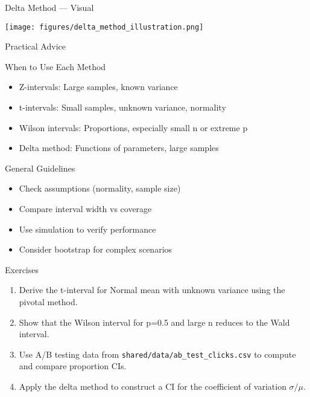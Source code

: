 \begin{frame}{Delta Method --- Visual}
  \begin{center}
    \texttt{[image: figures/delta\_method\_illustration.png]}
  \end{center}
\end{frame}

\begin{frame}{Practical Advice}
  \begin{block}{When to Use Each Method}
    \begin{itemize}
      \item Z-intervals: Large samples, known variance
      \item t-intervals: Small samples, unknown variance, normality
      \item Wilson intervals: Proportions, especially small n or extreme p
      \item Delta method: Functions of parameters, large samples
    \end{itemize}
  \end{block}

  \begin{block}{General Guidelines}
    \begin{itemize}
      \item Check assumptions (normality, sample size)
      \item Compare interval width vs coverage
      \item Use simulation to verify performance
      \item Consider bootstrap for complex scenarios
    \end{itemize}
  \end{block}
\end{frame}

\begin{frame}{Exercises}
  \begin{enumerate}
    \item Derive the t-interval for Normal mean with unknown variance using the pivotal method.
    \item Show that the Wilson interval for p=0.5 and large n reduces to the Wald interval.
    \item Use A/B testing data from \texttt{shared/data/ab\_test\_clicks.csv} to compute and compare proportion CIs.
    \item Apply the delta method to construct a CI for the coefficient of variation $\sigma/\mu$.
  \end{enumerate}
\end{frame}

